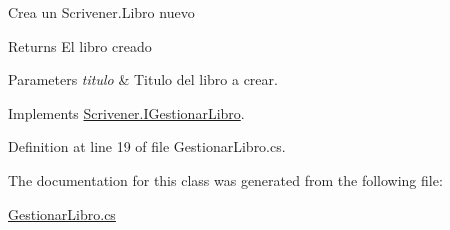 Crea un Scrivener.\-Libro nuevo 

\begin{DoxyReturn}{Returns}
El libro creado 
\end{DoxyReturn}

\begin{DoxyParams}{Parameters}
{\em titulo} & Titulo del libro a crear. \\
\hline
\end{DoxyParams}


Implements \hyperlink{interface_scrivener_1_1_i_gestionar_libro_abe9b21e4fcc8cac2242b9f7b514b9f84}{Scrivener.\-I\-Gestionar\-Libro}.



Definition at line 19 of file Gestionar\-Libro.\-cs.



The documentation for this class was generated from the following file\-:\begin{DoxyCompactItemize}
\item 
\hyperlink{_gestionar_libro_8cs}{Gestionar\-Libro.\-cs}\end{DoxyCompactItemize}
